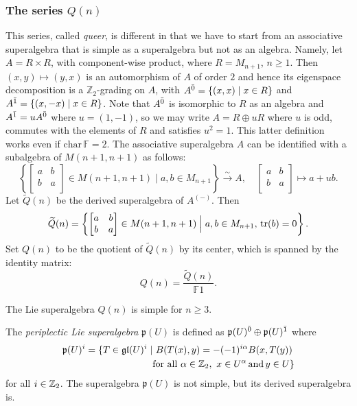 \subsubsection{The series $Q(n)$}

This series, called \emph{queer}, is different in that we have to start from an associative superalgebra that is simple as a superalgebra but not as an algebra. Namely, let $A=R\times R$, with component-wise product, where $R=M_{n+1}$, $n\ge 1$. Then $(x,y)\mapsto(y,x)$ is an automorphism of $A$ of order $2$ and hence its eigenspace decomposition is a $\mathbb{Z}_2$-grading on $A$, with $A^{\bar{0}}=\{(x,x)\;|\;x\in R\}$ and $A^{\bar{1}}=\{(x,-x)\;|\;x\in R\}$. Note that $A^{\bar{0}}$ is isomorphic to $R$ as an algebra and $A^{\bar{1}}=uA^{\bar{0}}$ where $u=(1,-1)$, so we may write $A=R\oplus uR$ where $u$ is odd, commutes with the elements of $R$ and satisfies $u^2=1$. This latter definition works even if $\mathrm{char}\,\mathbb{F}=2$. The associative superalgebra $A$ can be identified with a subalgebra of $M(n+1,n+1)$ as follows:
\[
	\left\{
	\left[
		\begin{matrix}
			a & b \\
			b & a \\
		\end{matrix}
		\right] \in M(n+1,n+1) \; \Big| \;
	a,b \in M_{n+1} \right\}\stackrel{\sim}{\to}A,\quad
	\left[\begin{matrix}
			a & b \\
			b & a \\
		\end{matrix}\right]\mapsto a+ub.
\]
Let $\widetilde{Q}(n)$ be the derived superalgebra of $A^{(-)}$. Then
\[
	\widetilde{Q} (n) = \left\{
	\left[
		\begin{matrix}
			a & b \\
			b & a \\
		\end{matrix}
		\right] \in M(n+1,n+1) \; \Big| \;
	a,b \in M_{n+1},\,\operatorname{tr}(b)=0 \right\}.
\]
Set $Q(n)$ to be the quotient of $\widetilde{Q}(n)$ by its center, which is spanned by the identity matrix:
\[
	Q(n)=\frac{\widetilde{Q} (n)}{\mathbb{F}1}.
\]

The Lie superalgebra $Q(n)$ is simple for $n\geq 3$.

The \emph{periplectic Lie superalgebra} $\mathfrak{p}(U)$ is defined as $\mathfrak{p}(U)^{\bar0} \oplus \mathfrak{p}(U)^{\bar1}$ where \[\begin{aligned}
		\mathfrak{p}(U)^{i} = \{T\in \mathfrak{gl}(U)^i\mid&\,\, B(T(x),y) = - (-1)^{i\alpha}B(x,T(y))\\ &\text{for all}\,\,\alpha\in\mathbb{Z}_{2},\,\, x\in U^{\alpha} \,\text{and}\, y\in U\}\end{aligned}\] for all $i\in\mathbb{Z}_{2}$. The superalgebra $\mathfrak{p}(U)$ is not simple, but its derived superalgebra is.

